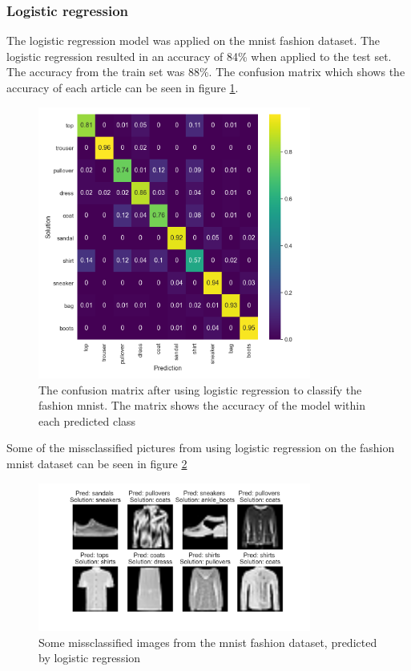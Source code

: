 \documentclass[../main.tex]{subfiles}
\begin{document}
\subsubsection{Logistic regression}
The logistic regression model was applied on the mnist fashion dataset. The logistic regression resulted in an accuracy of 84\% when applied to the test set. The accuracy from the train set was 88\%. The confusion matrix which shows the accuracy of each article can be seen in figure \ref{fig:logreg_mnist_cm}.
\begin{figure}[H]
    \centering
    \includegraphics[width=0.8\textwidth]{assets/logreg_fashion_heatmap_accuracy84.png}
    \caption{The confusion matrix after using logistic regression to classify the fashion mnist. The matrix shows the accuracy of the model within each predicted class}
    \label{fig:logreg_mnist_cm}
\end{figure}

Some of the missclassified pictures from using logistic regression on the fashion mnist dataset can be seen in figure \ref{fig:missclassified_logreg_fashion}

\begin{figure}[H]
    \centering
    \includegraphics[width=0.8\textwidth]{assets/logreg_missclassified_fasion.png}
    \caption{Some missclassified images from the mnist fashion dataset, predicted by logistic regression}
    \label{fig:missclassified_logreg_fashion}
\end{figure}
\end{document}
